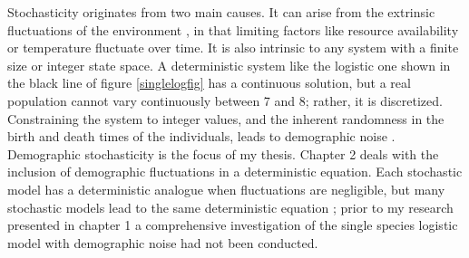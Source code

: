 Stochasticity originates from two main causes. 
It can arise from the extrinsic fluctuations of the environment \cite{Kamenev2008a,Chotibut2017a}, in that limiting factors like resource availability or temperature fluctuate over time. 
It is also intrinsic to any system with a finite size or integer state space. 
A deterministic system like the logistic one shown in the black line of figure \ref{singlelogfig} has a continuous solution, but a real population cannot vary continuously between 7 and 8; rather, it is discretized. %
Constraining the system to integer values, and the inherent randomness in the birth and death times of the individuals, leads to demographic noise \cite{Assaf2006,Gottesman2012,Dobrinevski2012,Gabel2013,Fisher2014,Constable2015,Lin2012,Chotibut2015,Young2018}. 
Demographic stochasticity is the focus of my thesis. 
Chapter 2 deals with the inclusion of demographic fluctuations in a deterministic equation. 
Each stochastic model has a deterministic analogue when fluctuations are negligible, but many stochastic models lead to the same deterministic equation \cite{Nisbet1982,Norden1982,Nasell2001,Rouzine2001,Gardiner2004}; prior to my research presented in chapter 1 a comprehensive investigation of the single species logistic model with demographic noise had not been conducted. %

